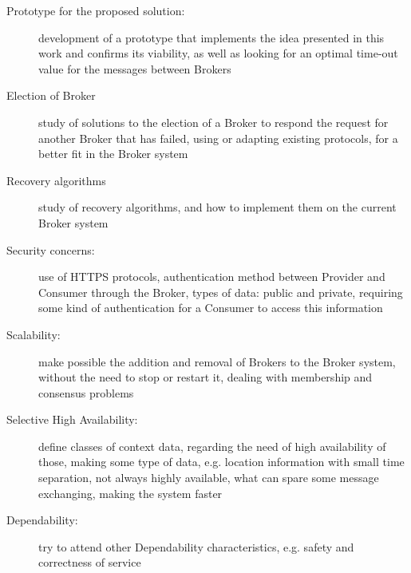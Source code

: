 \begin{description}
	\item[Prototype for the proposed solution:] development of a prototype that implements the idea presented in this work and confirms its viability, as well as looking for an optimal time-out value for the messages between Brokers
	
	\item[Election of Broker] study of solutions to the election of a Broker to respond the request for another Broker that has failed, using or adapting existing protocols, for a better fit in the Broker system
	
	\item[Recovery algorithms] study of recovery algorithms, and how to implement them on the current Broker system
	
	\item[Security concerns:] use of HTTPS protocols, authentication method between Provider and Consumer through the Broker, types of data: public and private, requiring some kind of authentication for a Consumer to access this information
	
	\item[Scalability:] make possible the addition and removal of Brokers to the Broker system, without the need to stop or restart it, dealing with membership and consensus problems
	
	\item[Selective High Availability:] define classes of context data, regarding the need of high availability of those, making some type of data, e.g. location information with small time separation, not always highly available, what can spare some message exchanging, making the system faster
	
	\item[Dependability:] try to attend other Dependability characteristics, e.g. safety and correctness of service

\end{description}

